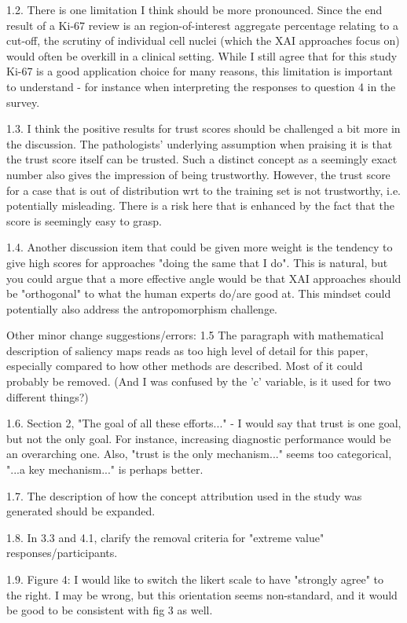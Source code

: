 1.2.  There is one limitation I think should be more pronounced. Since the end result of a Ki-67 review is an region-of-interest aggregate percentage relating to a cut-off, the scrutiny of individual cell nuclei (which the XAI approaches focus on) would often be overkill in a clinical setting. While I still agree that for this study Ki-67 is a good application choice for many reasons, this limitation is important to understand - for instance when interpreting the responses to question 4 in the survey.

1.3. I think the positive results for trust scores should be challenged a bit more in the discussion. The pathologists' underlying assumption when praising it is that the trust score itself can be trusted. Such a distinct concept as a seemingly exact number also gives the impression of being trustworthy. However, the trust score for a case that is out of distribution wrt to the training set is not trustworthy, i.e. potentially misleading. There is a risk here that is enhanced by the fact that the score is seemingly easy to grasp.

1.4. Another discussion item that could be given more weight is the tendency to give high scores for approaches "doing the same that I do". This is natural, but you could argue that a more effective angle would be that XAI approaches should be "orthogonal" to what the human experts do/are good at. This mindset could potentially also address the antropomorphism challenge.

Other minor change suggestions/errors:
1.5 The paragraph with mathematical description of saliency maps reads as too high level of detail for this paper, especially compared to how other methods are described. Most of it could probably be removed. (And I was confused by the 'c' variable, is it used for two different things?)

1.6. Section 2, "The goal of all these efforts..." - I would say that trust is one goal, but not the only goal. For instance, increasing diagnostic performance would be an overarching one. Also, "trust is the only mechanism..." seems too categorical, "...a key mechanism..." is perhaps better.

1.7. The description of how the concept attribution used in the study was generated should be expanded.

1.8. In 3.3 and 4.1, clarify the removal criteria for "extreme value" responses/participants.

1.9. Figure 4: I would like to switch the likert scale to have "strongly agree" to the right. I may be wrong, but this orientation seems non-standard, and it would be good to be consistent with fig 3 as well.

